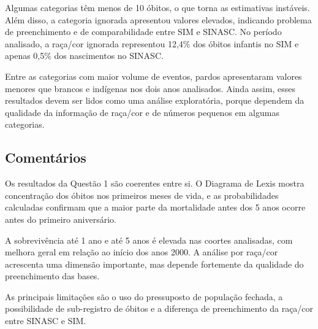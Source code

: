 Algumas categorias têm menos de 10 óbitos, o que torna as estimativas instáveis. Além disso, a categoria ignorada apresentou valores elevados, indicando problema de preenchimento e de comparabilidade entre SIM e SINASC. No período analisado, a raça/cor ignorada representou 12,4\% dos óbitos infantis no SIM e apenas 0,5\% dos nascimentos no SINASC.

Entre as categorias com maior volume de eventos, pardos apresentaram valores menores que brancos e indígenas nos dois anos analisados. Ainda assim, esses resultados devem ser lidos como uma análise exploratória, porque dependem da qualidade da informação de raça/cor e de números pequenos em algumas categorias.

\subsection{Comentários}

Os resultados da Questão 1 são coerentes entre si. O Diagrama de Lexis mostra concentração dos óbitos nos primeiros meses de vida, e as probabilidades calculadas confirmam que a maior parte da mortalidade antes dos 5 anos ocorre antes do primeiro aniversário.

A sobrevivência até 1 ano e até 5 anos é elevada nas coortes analisadas, com melhora geral em relação ao início dos anos 2000. A análise por raça/cor acrescenta uma dimensão importante, mas depende fortemente da qualidade do preenchimento das bases.

As principais limitações são o uso do pressuposto de população fechada, a possibilidade de sub-registro de óbitos e a diferença de preenchimento da raça/cor entre SINASC e SIM.
